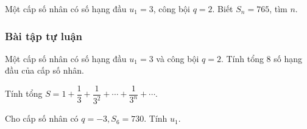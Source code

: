 \begin{vd}%
	Một cấp số nhân có số hạng đầu $u_1=3$, công bội $q=2$. Biết $S_n=765$, tìm $n$. 
\end{vd}

\subsubsection{Bài tập tự luận}
 
\begin{bt}%
	Một cấp số nhân có số hạng đầu $u_1=3$ và công bội $q=2 $. Tính tổng $8$ số hạng đầu của cấp số nhân.
\end{bt}



\begin{bt}%
	Tính tổng $S=1+\dfrac{1}{3}+\dfrac{1}{3^2}+\cdots+\dfrac{1}{3^n}+\cdots$.
\end{bt}

\begin{bt}%
	Cho cấp số nhân có $q=-3, S_6=730$. Tính $u_1$.
\end{bt}

